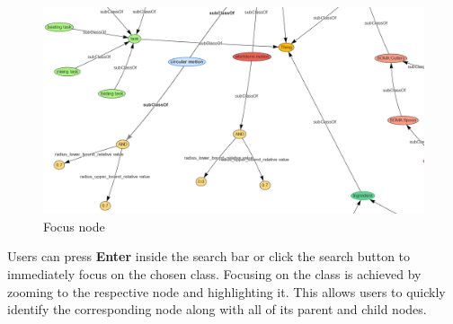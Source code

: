 \begin{figure}[H]
    \includegraphics[scale=0.25]{Graphics/OwlVisualizer/searchClass2.png}
    \centering
    \caption{Focus node}
\end{figure}

Users can press \textbf{Enter} inside the search bar or click the search button to immediately focus on the chosen class. 
Focusing on the class is achieved by zooming to the respective node and highlighting it. 
This allows users to quickly identify the corresponding node along with all of its parent and child nodes.

